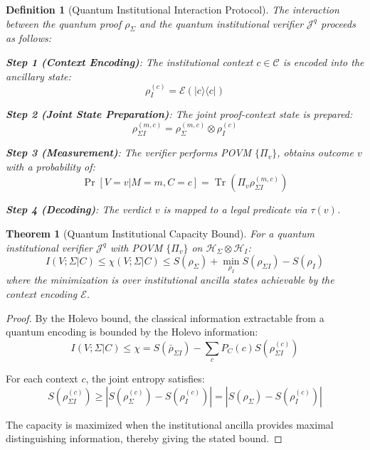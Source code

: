 \documentclass{ieeeaccess}
\newtheorem{theorem}{Theorem}[section]
\newtheorem{definition}{Definition}[section]
\begin{document}
\begin{definition}[Quantum Institutional Interaction Protocol]
The interaction between the quantum proof $\rho_\Sigma$ and the quantum institutional verifier $\mathcal{J}^q$ proceeds as follows:

\textbf{Step 1 (Context Encoding)}: The institutional context $c \in \mathcal{C}$ is encoded into the ancillary state:
\begin{equation}
    \rho_I^{(c)} = \mathcal{E}(|c\rangle\langle c|)
\end{equation}

\textbf{Step 2 (Joint State Preparation)}: The joint proof-context state is prepared:
\begin{equation}
    \rho_{\Sigma I}^{(m,c)} = \rho_\Sigma^{(m,c)} \otimes \rho_I^{(c)}
\end{equation}

\textbf{Step 3 (Measurement)}: The verifier performs POVM $\{\Pi_v\}$, obtains outcome $v$ with a probability of:
\begin{equation}
    \Pr[V = v | M = m, C = c] = \operatorname{Tr}(\Pi_v \rho_{\Sigma I}^{(m,c)})
\end{equation}

\textbf{Step 4 (Decoding)}: The verdict $v$ is mapped to a legal predicate via $\tau(v)$.
\end{definition}

\begin{theorem}[Quantum Institutional Capacity Bound]
For a quantum institutional verifier $\mathcal{J}^q$ with POVM $\{\Pi_v\}$ on $\mathcal{H}_\Sigma \otimes \mathcal{H}_I$:
\begin{equation}
    I(V; \Sigma|C) \leq χ(V; \Sigma|C) \leq S(\rho_\Sigma) + \min_{\rho_I} S(\rho_{\Sigma I}) - S(\rho_I)
\end{equation}
where the minimization is over institutional ancilla states achievable by the context encoding $\mathcal{E}$.
\end{theorem}

\begin{proof}
By the Holevo bound, the classical information extractable from a quantum encoding is bounded by the Holevo information:
\begin{equation}
    I(V; \Sigma|C) \leq χ = S(\bar{\rho}_{\Sigma I}) - \sum_{c} P_C(c) S(\rho_{\Sigma I}^{(c)})
\end{equation}

For each context $c$, the joint entropy satisfies:
\begin{equation}
    S(\rho_{\Sigma I}^{(c)}) \geq |S(\rho_\Sigma^{(c)}) - S(\rho_I^{(c)})| = |S(\rho_\Sigma) - S(\rho_I^{(c)})|
\end{equation}

The capacity is maximized when the institutional ancilla provides maximal distinguishing information, thereby giving the stated bound.
\end{proof}
\end{document}
